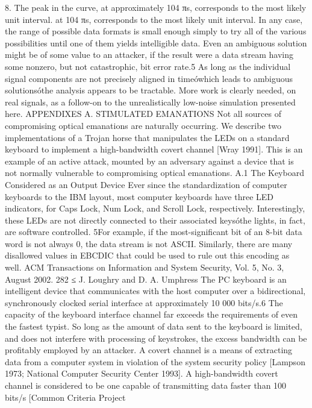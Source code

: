 8. The peak in the curve, at approximately 104 πs, corresponds to the most likely unit interval. 
at 104 πs, corresponds to the most likely unit interval. In any case, the range 
of possible data formats is small enough simply to try all of the various possibilities 
until one of them yields intelligible data. Even an ambiguous solution 
might be of some value to an attacker, if the result were a data stream having 
some nonzero, but not catastrophic, bit error rate.5 As long as the individual 
signal components are not precisely aligned in timeówhich leads to ambiguous 
solutionsóthe analysis appears to be tractable. More work is clearly needed, on 
real signals, as a follow-on to the unrealistically low-noise simulation presented 
here. 
APPENDIXES 
A. STIMULATED EMANATIONS 
Not all sources of compromising optical emanations are naturally occurring. 
We describe two implementations of a Trojan horse that manipulates the 
LEDs on a standard keyboard to implement a high-bandwidth covert channel 
[Wray 1991]. This is an example of an active attack, mounted by an adversary 
against a device that is not normally vulnerable to compromising optical 
emanations. 
A.1 The Keyboard Considered as an Output Device 
Ever since the standardization of computer keyboards to the IBM layout, most 
computer keyboards have three LED indicators, for Caps Lock, Num Lock, and 
Scroll Lock, respectively. Interestingly, these LEDs are not directly connected 
to their associated keysóthe lights, in fact, are software controlled. 
5For example, if the most-significant bit of an 8-bit data word is not always 0, the data stream is 
not ASCII. Similarly, there are many disallowed values in EBCDIC that could be used to rule out 
this encoding as well. 
ACM Transactions on Information and System Security, Vol. 5, No. 3, August 2002.
282 ≤ J. Loughry and D. A. Umphress 
The PC keyboard is an intelligent device that communicates with the host 
computer over a bidirectional, synchronously clocked serial interface at approximately 
10 000 bits/s.6 
The capacity of the keyboard interface channel far exceeds the requirements 
of even the fastest typist. So long as the amount of data sent to the keyboard is 
limited, and does not interfere with processing of keystrokes, the excess bandwidth 
can be profitably employed by an attacker. 
A covert channel is a means of extracting data from a computer system 
in violation of the system security policy [Lampson 1973; National Computer 
Security Center 1993]. A high-bandwidth covert channel is considered to be one 
capable of transmitting data faster than 100 bits/s [Common Criteria Project 
